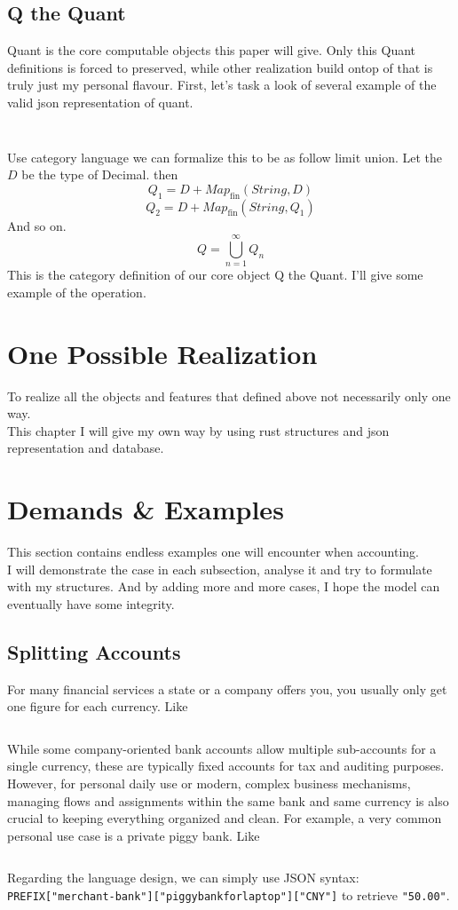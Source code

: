 \subsection{Q the Quant}
Quant is the core computable objects this paper will give.
Only this Quant definitions is forced to preserved,
while other realization build ontop of that is truly just my
personal flavour.
First, let's task a look of several example of the valid json
representation of quant.
\inputminted{json}{jsonobs/Q-2.json}
\inputminted{json}{jsonobs/Q-3.json}
Use category language we can formalize this to be as follow
limit union.
Let the $D$ be the type of Decimal. then
$$
    Q_1 = D + Map_{\mathrm{fin}}(String,D)
$$
$$
    Q_2 = D + Map_{\mathrm{fin}}(String,Q_1)
$$
And so on.
$$
    Q = \bigcup_{n=1}^{\infty} Q_n
$$
This is the category definition of our core object Q the
Quant.
I'll give some example of the operation.




\section{One Possible Realization}
To realize all the objects and features that
defined above not necessarily only one way.\\
This chapter I will give my own way by
using rust structures and json representation and
database.




\section{Demands \& Examples}
This section contains endless examples one
will encounter when accounting.\\
I will demonstrate the case in each subsection,
analyse it and try to formulate with my structures.
And by adding more and more cases,
I hope the model can eventually have some integrity.


\subsection{Splitting Accounts}
For many financial services a state or a company offers
you, you usually only get one figure for each currency.
Like \inputminted{json}{jsonobs/spliting-accounts-1.json}
While some company-oriented bank accounts allow
multiple sub-accounts for a single currency, these are
typically fixed accounts for tax and auditing purposes.\\
However, for personal daily use or modern, complex business
mechanisms, managing flows and assignments within the same bank
and same currency is also crucial to keeping everything
organized and clean.
For example, a very common personal use case is a
private piggy bank.
Like \inputminted{json}{jsonobs/spliting-accounts-2.json}
Regarding the language design, we can simply use JSON syntax:\\
\texttt{PREFIX["merchant-bank"]["piggybankforlaptop"]["CNY"]} to retrieve \texttt{"50.00"}.


